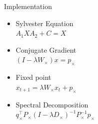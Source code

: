 \documentclass[compress]{beamer}
\begin{document}
\begin{frame}{Implementation}
	\begin{multicols}{2}
		\begin{itemize}
			\setlength\itemsep{4em}
			\item Sylvester Equation\\$A_{1}XA_{2}+C=X$
			\pause
			\item Conjugate Gradient\\$(I-\lambda W_{\times})x=p_{\times}$
			\pause
			\setlength\itemsep{4em}
			\item Fixed point\\$x_{t+1}=\lambda W_{\times}x_{t}+p_{\times}$
			\pause
			\item Spectral Decomposition\\$q_{\times}^{\top}P_{\times}(I-\lambda D_{\times})^{-1}P_{\times}^{-1}p_{\times}$
		\end{itemize}
	\end{multicols}
\end{frame}
\end{document}
